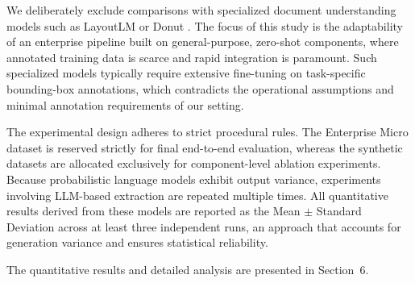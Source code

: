 We deliberately exclude comparisons with specialized document understanding models such as LayoutLM \parencite{xu2020layoutlm} or Donut \parencite{kim2022ocr}. The focus of this study is the adaptability of an enterprise pipeline built on general-purpose, zero-shot components, where annotated training data is scarce and rapid integration is paramount. Such specialized models typically require extensive fine-tuning on task-specific bounding-box annotations, which contradicts the operational assumptions and minimal annotation requirements of our setting.

The experimental design adheres to strict procedural rules. The Enterprise Micro dataset is reserved strictly for final end-to-end evaluation, whereas the synthetic datasets are allocated exclusively for component-level ablation experiments. Because probabilistic language models exhibit output variance, experiments involving LLM-based extraction are repeated multiple times. All quantitative results derived from these models are reported as the Mean $\pm$ Standard Deviation across at least three independent runs, an approach that accounts for generation variance and ensures statistical reliability.

The quantitative results and detailed analysis are presented in Section~6.